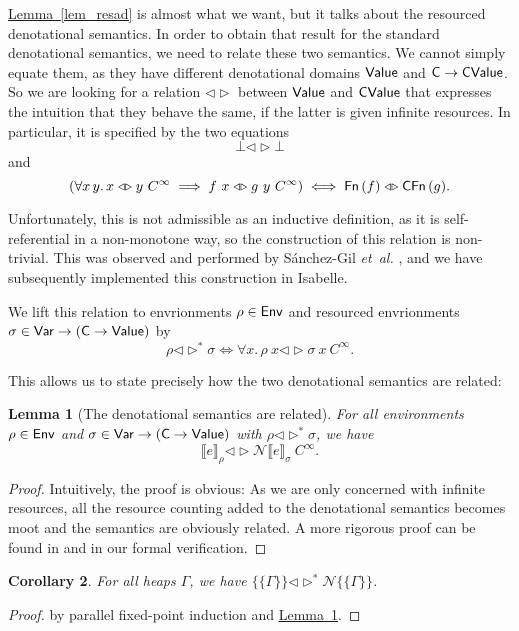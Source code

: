 \documentclass{jfp1}
\newcommand{\myref}[2]{\hyperref[#2]{#1~\ref*{#2}}}
\newtheorem{lemma}{Lemma}
\newtheorem{corollary}[lemma]{Corollary}
\theoremstyle{nonumberbreak}
\newtheorem{proof}{Proof}
\newcommand{\sVar}   {\text{\textsf{Var}}}
\newcommand{\sValue} {\text{\textsf{Value}}}
\newcommand{\sCValue}{\text{\textsf{CValue}}}
\newcommand{\sEnv}   {\text{\textsf{Env}}}
\newcommand{\sC}     {\text{\textsf{C}}}
\newcommand{\sFn}[1]{\text{\textsf{Fn}}\,(#1)}
\newcommand{\sCFn}[1]{\text{\textsf{CFn}}\,(#1)}
\newcommand{\dsem}[2]{\llbracket #1 \rrbracket_{#2}}
\newcommand{\esem}[1]{\{\!\!\!\{#1\}\!\!\!\}}
\newcommand{\dsemr}[2]{\mathcal N\!\llbracket #1 \rrbracket_{#2}}
\newcommand{\esemr}[1]{\mathcal N\!\!\{\!\!\!\{#1\}\!\!\!\}}
\newcommand{\dsim}{\mathrel{\triangleleft\triangleright}}
\newcommand{\dsimheap}{\mathrel{\triangleleft\triangleright^*}}
\begin{document}
\myref{Lemma}{lem_resad} is almost what we want, but it talks about the resourced denotational semantics. In order to obtain that result for the standard denotational semantics, we need to relate these two semantics. We cannot simply equate them, as they have different denotational domains $\sValue$ and $\sC\to\sCValue$. So we are looking for a relation $\dsim$ between $\sValue$ and $\sCValue$ that expresses the intuition that they behave the same, if the latter is given infinite resources. In particular, it is specified by the two equations
\[
\bot \dsim \bot
\]
and
\[
(\forall x\,y.\, x \dsim y~C^\infty \implies f~ x \dsim g~y~C^\infty)
\iff \sFn f \dsim \sCFn g.
\]

Unfortunately, this is not admissible as an inductive definition, as it is self-referential in a non-monotone way, so the construction of this relation is non-trivial. This was observed and performed by S{\'a}nchez-Gil {\em et~al.} , and we have subsequently implemented this construction in Isabelle.

We lift this relation to envrionments $\rho \in \sEnv$ and resourced envrionments $\sigma \in \sVar \to (\sC \to \sValue)$ by
\[
\rho \dsimheap \sigma \iff \forall x.\, \rho~x \dsim \sigma~x~C^\infty.
\]

This allows us to state precisely how the two denotational semantics are related:

\begin{lemma}[The denotational semantics are related]
\label{lem_denrel}
For all environments $\rho \in \sEnv$ and $\sigma \in \sVar \to (\sC \to \sValue)$ with $\rho \dsimheap \sigma$, we have
\[
\dsem e \rho \dsim \dsemr e \sigma~{C^\infty}.
\]
\end{lemma}

\begin{proof}
Intuitively, the proof is obvious: As we are only concerned with infinite resources, all the resource counting added to the denotational semantics becomes moot and the semantics are obviously related. A more rigorous proof can be found in \cite{functionspaces} and in our formal verification.
\end{proof}

\begin{corollary}
For all heaps $\Gamma$, we have $\esem{\Gamma}\dsimheap \esemr{\Gamma}$.
\label{lem_denrelheap}
\end{corollary}

\begin{proof}
by parallel fixed-point induction and \myref{Lemma}{lem_denrel}.
\end{proof}
\end{document}
